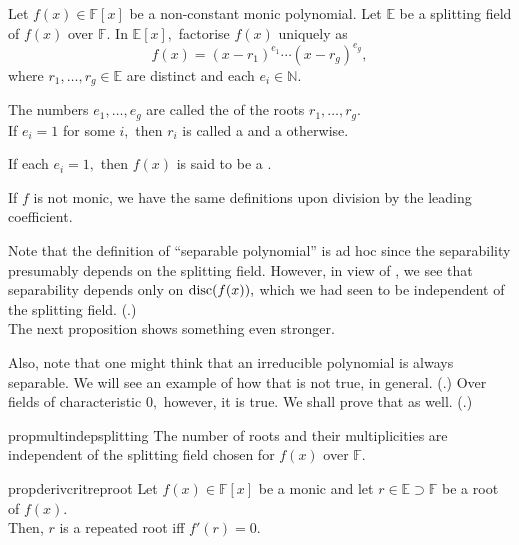 \begin{defn}%
    Let $f(x) \in \mathbb{F}[x]$ be a non-constant monic polynomial. Let $\mathbb{E}$ be a splitting field of $f(x)$ over $\mathbb{F}.$ In $\mathbb{E}[x],$ factorise $f(x)$ uniquely as
    \begin{equation*} 
        f(x) = (x - r_1)^{e_1} \cdots (x - r_g)^{e_g},
    \end{equation*}
    where $r_1, \ldots, r_g \in \mathbb{E}$ are distinct and each $e_i \in \mathbb{N}.$ 

    The numbers $e_1, \ldots, e_g$ are called the  of the roots $r_1, \ldots, r_g.$ \\
    If $e_i = 1$ for some $i,$ then $r_i$ is called a  and a  otherwise.

    If each $e_i = 1,$ then $f(x)$ is said to be a .

    If $f$ is not monic, we have the same definitions upon division by the leading coefficient.
\end{defn}

\begin{rem}
    Note that the definition of ``separable polynomial'' is ad hoc since the separability presumably depends on the splitting field. However, in view of , we see that separability depends only on $\operatorname{disc}(f(x)),$ which we had seen to be independent of the splitting field. (.) \\
    The next proposition shows something even stronger.

    Also, note that one might think that an irreducible polynomial is always separable. We will see an example of how that is not true, in general. (.) Over fields of characteristic $0,$ however, it is true. We shall prove that as well. (.)
\end{rem}

\begin{restatable}[]{prop}{multindepsplitting}
\label{prop:multindepsplitting}
    The number of roots and their multiplicities are independent of the splitting field chosen for $f(x)$ over $\mathbb{F}.$ \hfill\hyperref[prop:multindepsplitting2]{\downsym}
\end{restatable}

\begin{restatable}[]{prop}{derivcritreproot}
\label{prop:derivcritreproot}
    Let $f(x) \in \mathbb{F}[x]$ be a monic and let $r \in \mathbb{E} \supset \mathbb{F}$ be a root of $f(x).$ \\
    Then, $r$ is a repeated root iff $f'(r) = 0.$ \hfill\hyperref[prop:derivcritreproot2]{\downsym}
\end{restatable}

